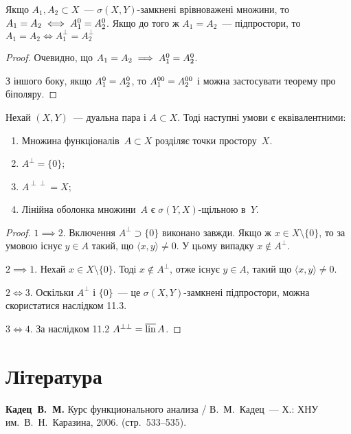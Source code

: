 \begin{corollary}
    Якщо $A_1, A_2 \subset X$~--- $\sigma(X, Y)$-замкнені врівноважені множини, то $A_1 = A_2 \iff A_1^0 = A_2^0$. Якщо до того ж $A_1 = A_2$~--- підпростори, то $A_1 = A_2 \iff A_1^\perp = A_2^\perp$
\end{corollary}

\begin{proof}
    Очевидно, що $A_1 = A_2 \implies A_1^0 = A_2^0$.
    
    З іншого боку, якщо $A_1^0 = A_2^0$, то $A_1^{00} = A_2^{00}$ і можна застосувати теорему про біполяру.
\end{proof}

\begin{theorem}
    Нехай $(X, Y)$~--- дуальна пара і $A \subset X$.
    Тоді наступні умови є еквівалентними:
    \begin{enumerate}
        \item Множина функціоналів~$A \subset X$ розділяє точки простору~$X$.
        \item $A^\perp = \{0\}$;
        \item $A^{\perp\perp} = X$;
        \item Лінійна оболонка множини~$A$ є $\sigma(Y, X)$-щільною в~$Y$.
    \end{enumerate}
\end{theorem}

\begin{proof}
    $1 \implies 2$. Включення $A^\perp \supset \{0\}$ виконано завжди. Якщо ж $x \in X \setminus \{0\}$, то за умовою існує $y \in A$ такий, що $\langle x, y \rangle \ne 0$. У цьому випадку $x \notin A^\perp$.

    $2 \implies 1$. Нехай $x \in X \setminus \{0\}$. Тоді $x \notin A^\perp$, отже існує $y \in A$, такий що $\langle x, y \rangle \ne 0$.

    $2 \iff 3$. Оскільки $A^\perp$ і $\{0\}$~--- це $\sigma(X, Y)$-замкнені підпростори, можна скористатися наслідком 11.3.

    $3 \iff 4$. За наслідком 11.2 $A^{\perp\perp} = \operatorname{\overline{lin}} A$.
\end{proof}

\section{Література}

\begin{enumerate}[label={[\arabic*]}]
\item \textbf{Кадец~В.~М.}
Курс функционального анализа /
В.~М.~Кадец~---
Х.: ХНУ им.~В.~Н.~Каразина, 2006. (стр.~533--535).
\end{enumerate}
